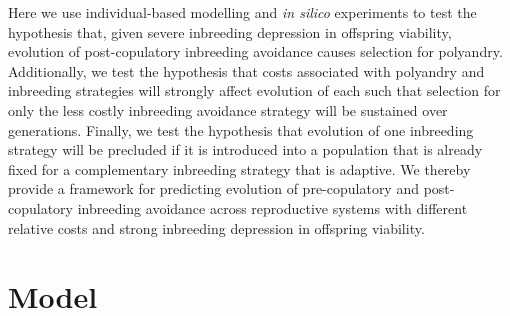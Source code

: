 \documentclass[10pt,letterpaper]{article}
\begin{document}
Here we use individual-based modelling and \textit{in silico} experiments to test the hypothesis that, given severe inbreeding depression in offspring viability, evolution of post-copulatory inbreeding avoidance causes selection for polyandry. Additionally, we test the hypothesis that costs associated with polyandry and inbreeding strategies will strongly affect evolution of each such that selection for only the less costly inbreeding avoidance strategy will be sustained over generations. Finally, we test the hypothesis that evolution of one inbreeding strategy will be precluded if it is introduced into a population that is already fixed for a complementary inbreeding strategy that is adaptive. We thereby provide a framework for predicting evolution of pre-copulatory and post-copulatory inbreeding avoidance across reproductive systems with different relative costs and strong inbreeding depression in offspring viability.

\section*{Model}
\end{document}
